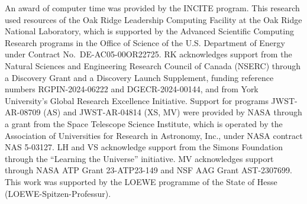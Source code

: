 \documentclass[apj,twocolumn, appendixfloats, twocolappendix, numberedappendix, tighten]{openjournal}
\begin{document}
An award of computer time was provided by the INCITE program. This research used resources of the Oak Ridge Leadership Computing Facility at the Oak Ridge National Laboratory, which is supported by the Advanced Scientific Computing Research programs in the Office of Science of the U.S. Department of Energy under Contract No.\ DE-AC05-00OR22725. RK acknowledges support from the Natural Sciences and Engineering Research Council of Canada (NSERC) through a Discovery Grant and a Discovery Launch Supplement, funding reference numbers RGPIN-2024-06222 and DGECR-2024-00144, and from York University's Global Research Excellence Initiative. Support for programs JWST-AR-08709 (AS) and JWST-AR-04814 (XS, MV) were provided by NASA through a grant from the Space Telescope Science Institute, which is operated by the Association of Universities for Research in Astronomy, Inc., under NASA contract NAS 5-03127.
LH and VS acknowledge support from the Simons Foundation through the ``Learning the Universe'' initiative. MV acknowledges support through NASA ATP Grant 23-ATP23-149 and NSF AAG Grant AST-2307699. This work was supported by the LOEWE programme of the State of Hesse (LOEWE-Spitzen-Professur).





\end{document}
